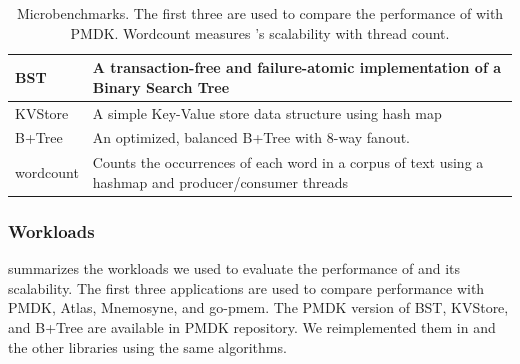 \begin{table}
      \center
      \footnotesize
    \begin{tabular}{|p{0.5in}|p{2.5in}|}
        \hline
        BST & A transaction-free and failure-atomic implementation of a Binary Search Tree \\ \hline
        KVStore & A simple Key-Value store data structure using hash map \\ \hline
        B+Tree & An optimized, balanced B+Tree with 8-way fanout.  \\ \hline
        wordcount & Counts the occurrences of each word in a corpus of text using a hashmap and producer/consumer threads\\\hline
    \end{tabular}
    \caption{Microbenchmarks. The first three are used to compare the performance of \this{} with PMDK. Wordcount measures \this{}'s scalability with thread count.}
    \label{tab:perf:wrkld}
\end{table}


\subsubsection{Workloads}
\label{sec:res:perf:workload}

 summarizes the workloads we used to evaluate the performance of \this{} and its scalability.  The first three applications are used to compare performance with PMDK, Atlas, Mnemosyne, and go-pmem. The PMDK version of BST, KVStore, and B+Tree are available in PMDK repository. We reimplemented them in \this{} and the other libraries using the same algorithms.


